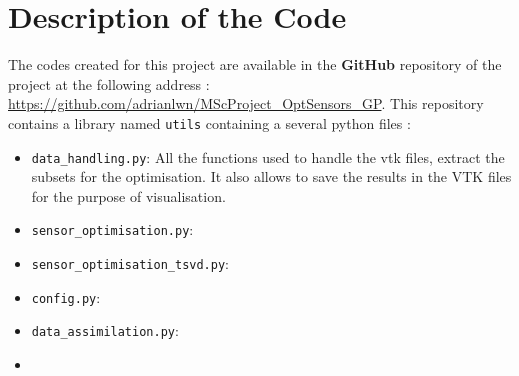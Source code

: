 \chapter{Description of the Code} \label{appendix:code}

The codes created for this project are available in the \textbf{GitHub} repository of the project at the following address : \url{https://github.com/adrianlwn/MScProject\_OptSensors\_GP}. This repository contains a library named \texttt{utils} containing a several python files : 

\begin{itemize}
	\item \texttt{data\_handling.py}: All the functions used to handle the vtk files, extract the subsets for the optimisation. It also allows to save the results in the VTK files for the purpose of visualisation. 
	\item \texttt{sensor\_optimisation.py}: 
	\item \texttt{sensor\_optimisation\_tsvd.py}:  
	\item \texttt{config.py}:
	\item \texttt{data\_assimilation.py}: 
	\item  
\end{itemize}